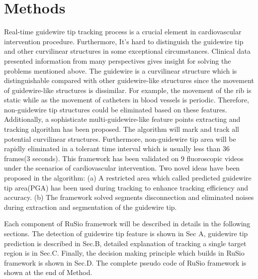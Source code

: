 \documentclass[journal]{IEEEtran}
\begin{document}
\section{Methods}
Real-time guidewire tip tracking process is a crucial element in cardiovascular intervention procedure. Furthermore, It's hard to distinguish the guidewire tip and other curvilinear structures in some exceptional circumstances. Clinical data presented information from many perspectives gives insight for solving the problems mentioned above. The guidewire is a curvilinear structure which is distinguishable compared with other guidewire-like structures since the movement of guidewire-like structures is dissimilar. For example, the movement of the rib is static while as the movement of catheters in blood vessels is periodic. Therefore, non-guidewire tip structures could be eliminated based on these features. Additionally, a sophisticate multi-guidewire-like feature points extracting and tracking algorithm has been proposed. The algorithm will mark and track all potential curvilinear structures. Furthermore, non-guidewire tip area will be rapidly eliminated in a tolerant time interval which is usually less than 36 frames(3 seconds). This framework has been validated on 9 fluoroscopic videos under the scenarios of cardiovascular intervention. Two novel ideas have been proposed in the algorithm: (a) A restricted area which called predicted guidewire tip area(PGA) has been used during tracking to enhance tracking efficiency and accuracy. (b) The framework solved segments disconnection and eliminated noises during extraction and segmentation of the guidewire tip.
\par
Each component of RuSio framework will be described in details in the following sections. The detection of guidewire tip feature is shown in Sec A, guidewire tip prediction is described in Sec.B, detailed explanation of tracking a single target region is in Sec.C. Finally, the decision making principle which builds in RuSio framework is shown in Sec.D. The complete pseudo code of RuSio framework is shown at the end of Method.
\end{document}
